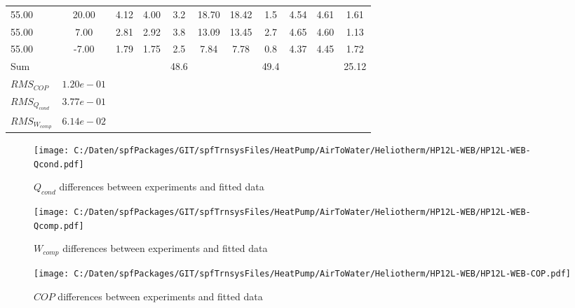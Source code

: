 \documentclass[english]{SPFShortReport}
\begin{document}
\begin{table}[!ht]
\begin{small}
\begin{center}
{\begin{tabular}{l | c c c c c c c c c c }
55.00  & 20.00 & 4.12 & 4.00 & 3.2 & 18.70 & 18.42 & 1.5 & 4.54 & 4.61 & 1.61\\ 
55.00  & 7.00 & 2.81 & 2.92 & 3.8 & 13.09 & 13.45 & 2.7 & 4.65 & 4.60 & 1.13\\ 
55.00  & -7.00 & 1.79 & 1.75 & 2.5 & 7.84 & 7.78 & 0.8 & 4.37 & 4.45 & 1.72\\ 
\hline 
 Sum &  & &  & 48.6 &  &  & 49.4 & &  & 25.12\\ 
\hline 
 $RMS_{COP}$ & $1.20e-01$ \\ 
 $RMS_{Q_{cond}}$ & $3.77e-01$ \\ 
 $RMS_{W_{comp}}$ & $6.14e-02$ \\ 
\hline
\hline
\end{tabular}
}
\label{ErrorsTable}
\end{center}
\end{small}
\end{table}
\begin{figure}[!ht]
\begin{center}
\texttt{[image: C:/Daten/spfPackages/GIT/spfTrnsysFiles/HeatPump/AirToWater/Heliotherm/HP12L-WEB/HP12L-WEB-Qcond.pdf]}
\caption{$Q_{cond}$ differences between experiments and fitted data}
\label{QcongFig}
\end{center}
\end{figure}
\begin{figure}[!ht]
\begin{center}
\texttt{[image: C:/Daten/spfPackages/GIT/spfTrnsysFiles/HeatPump/AirToWater/Heliotherm/HP12L-WEB/HP12L-WEB-Qcomp.pdf]}
\caption{$W_{comp}$ differences between experiments and fitted data}
\label{QcompFig}
\end{center}
\end{figure}
\begin{figure}[!ht]
\begin{center}
\texttt{[image: C:/Daten/spfPackages/GIT/spfTrnsysFiles/HeatPump/AirToWater/Heliotherm/HP12L-WEB/HP12L-WEB-COP.pdf]}
\caption{$COP$ differences between experiments and fitted data}
\label{COPFig}
\end{center}
\end{figure}
\end{document}
